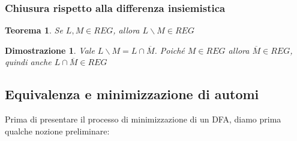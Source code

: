 \documentclass[12pt]{article}
\newtheorem{Teorema}{Teorema}[subsection]
\newtheorem{Dimostrazione}{Dimostrazione}[subsection]
\begin{document}
\subsubsection{Chiusura rispetto alla differenza insiemistica}
\begin{Teorema}
    Se $L, M \in REG$, allora $L \backslash M \in REG$
\end{Teorema}
\begin{Dimostrazione}
    Vale $L \backslash M = L \cap \overline{M}$. Poiché $M \in REG$ allora $\overline{M} \in REG$, quindi anche $L \cap \overline{M} \in REG$
\end{Dimostrazione}
\subsection{Equivalenza e minimizzazione di automi}
Prima di presentare il processo di minimizzazione di un DFA, diamo prima qualche nozione preliminare:
\end{document}
